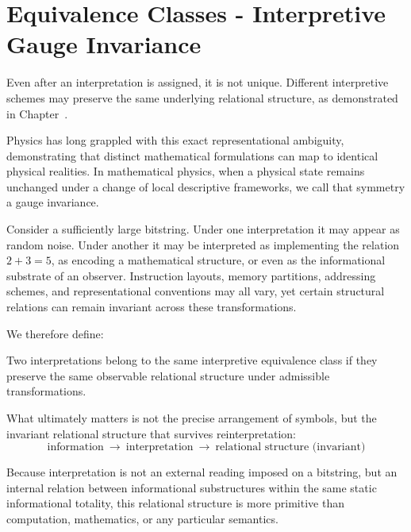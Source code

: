 \section{Equivalence Classes - Interpretive Gauge Invariance}

Even after an interpretation is assigned, it is not unique.
Different interpretive schemes may preserve the same underlying relational structure, as demonstrated
in Chapter~.

Physics has long grappled with this exact representational ambiguity, demonstrating that distinct mathematical formulations can map to identical physical realities.
In mathematical physics, when a physical state remains unchanged under a change of local descriptive frameworks, we call that symmetry a gauge invariance.

Consider a sufficiently large bitstring.
Under one interpretation it may appear as random noise.
Under another it may be interpreted as implementing the relation $2 + 3 = 5$, as encoding a mathematical structure, or even as the informational substrate of an observer.
Instruction layouts, memory partitions, addressing schemes, and representational conventions may all vary, yet certain structural relations can remain invariant across these transformations.

We therefore define:

\begin{tcolorbox}[title=Interpretive Equivalence Class]
Two interpretations belong to the same interpretive equivalence class if they preserve the same observable relational structure under admissible transformations.
\end{tcolorbox}

What ultimately matters is not the precise arrangement of symbols, but the invariant relational structure that survives reinterpretation:
\[
\text{information} \ \longrightarrow \ \text{interpretation} \ \longrightarrow \ \text{relational structure (invariant)}
\]

Because interpretation is not an external reading imposed on a bitstring, but an internal relation between informational substructures within the same static informational totality, 
this relational structure is more primitive than computation, mathematics, or any particular semantics.

